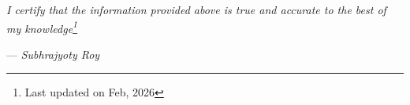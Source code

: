 \documentclass[11pt]{developercv} %
\begin{document}



\textit{I certify that the information provided above is true and accurate to the best of my knowledge\footnote{Last updated on Feb, 2026}}
\begin{flushright}
    --- {\textit{Subhrajyoty Roy}}
\end{flushright}
\end{document}

